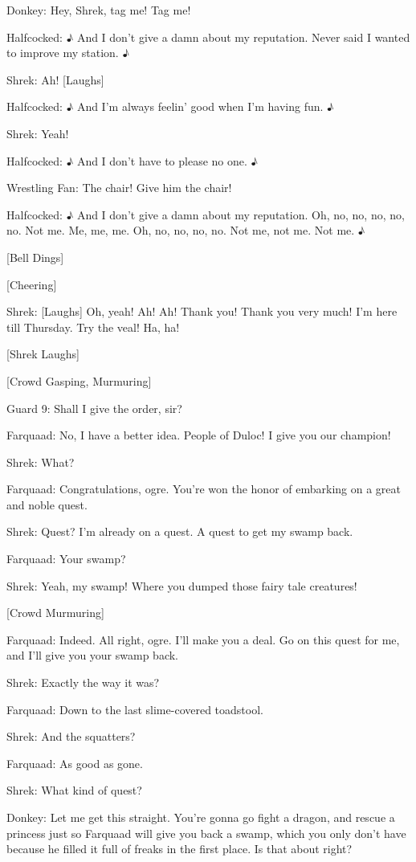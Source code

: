\documentclass{article}
\begin{document}
Donkey:
Hey, Shrek, tag me! Tag me!

Halfcocked:
♪ And I don't give a damn about my reputation. Never said I wanted to improve my station. ♪

Shrek:
Ah! [Laughs]

Halfcocked:
♪ And I'm always feelin' good when I'm having fun. ♪

Shrek:
Yeah!

Halfcocked:
♪ And I don't have to please no one. ♪

Wrestling Fan:
The chair! Give him the chair!

Halfcocked:
♪ And I don't give a damn about my reputation. Oh, no, no, no, no, no. Not me. Me, me, me. Oh, no, no, no, no. Not me, not me. Not me. ♪

[Bell Dings]

[Cheering]

Shrek:
[Laughs] Oh, yeah! Ah! Ah! Thank you! Thank you very much! I'm here till Thursday. Try the veal! Ha, ha!

[Shrek Laughs]

[Crowd Gasping, Murmuring]

Guard 9:
Shall I give the order, sir?

Farquaad:
No, I have a better idea. People of Duloc! I give you our champion!

Shrek:
What?

Farquaad:
Congratulations, ogre. You're won the honor of embarking on a great and noble quest.

Shrek:
Quest? I'm already on a quest. A quest to get my swamp back.

Farquaad:
Your swamp?

Shrek:
Yeah, my swamp! Where you dumped those fairy tale creatures!

[Crowd Murmuring]

Farquaad:
Indeed. All right, ogre. I'll make you a deal. Go on this quest for me, and I'll give you your swamp back.

Shrek:
Exactly the way it was?

Farquaad:
Down to the last slime-covered toadstool.

Shrek:
And the squatters?

Farquaad:
As good as gone.

Shrek:
What kind of quest?

Donkey:
Let me get this straight. You're gonna go fight a dragon, and rescue a princess just so Farquaad will give you back a swamp, which you only don't have because he filled it full of freaks in the first place. Is that about right?
\end{document}
